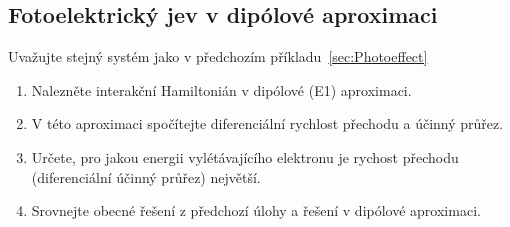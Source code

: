 \subsection{Fotoelektrický jev v dipólové aproximaci}\label{ex:PhotoeffectDipol}
Uvažujte stejný systém jako v předchozím příkladu~\ref{sec:Photoeffect}
\begin{enumerate}
	\item Nalezněte interakční Hamiltonián v dipólové (E1) aproximaci.

	\item V této aproximaci spočítejte diferenciální rychlost přechodu a účinný průřez.
	
	\item Určete, pro jakou energii vylétávajícího elektronu je rychost přechodu (diferenciální účinný průřez) největší.
		
	\item Srovnejte obecné řešení z předchozí úlohy a řešení v dipólové aproximaci.
\end{enumerate}

